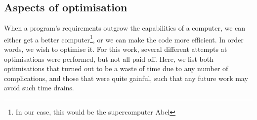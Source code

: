 \documentclass[10pt,twoside]{report}
\begin{document}
	\subsection{Aspects of optimisation}
	\label{Implementation | sec | "optimisations"}
	When a program's requirements outgrow the capabilities of a computer, we can either get a better computer\footnote{In our case, this would be the supercomputer Abel}, or we can make the code more efficient. In order words, we wish to optimise it. For this work, several different attempts at optimisations were performed, but not all paid off. Here, we list both optimisations that turned out to be a waste of time due to any number of complications, and those that were quite gainful, such that any future work may avoid such time drains.\\
	
\end{document}
